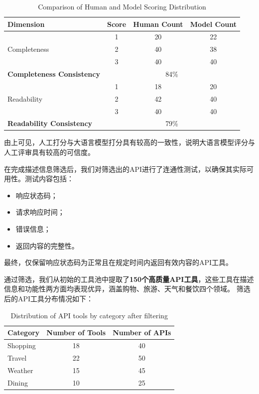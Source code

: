 \begin{table}[h]
  \centering
  \caption{Comparison of Human and Model Scoring Distribution}
  \label{tab:api_score_comparison}
  \begin{tabular}{l|c|c|c}
  \toprule
  \textbf{Dimension} & \textbf{Score} & \textbf{Human Count} & \textbf{Model Count} \\ \midrule
  \multirow{3}{*}{Completeness} & 1 & 20 & 22 \\ 
                                & 2 & 40 & 38 \\ 
                                & 3 & 40 & 40 \\ \hline
  \textbf{Completeness Consistency} & \multicolumn{3}{c}{84\%} \\ \midrule
  \multirow{3}{*}{Readability}  & 1 & 18 & 20 \\ 
                                & 2 & 42 & 40 \\ 
                                & 3 & 40 & 40 \\ \hline
  \textbf{Readability Consistency} & \multicolumn{3}{c}{79\%} \\ 
  \bottomrule
  \end{tabular}
  \end{table}

由上可见，人工打分与大语言模型打分具有较高的一致性，说明大语言模型评分与人工评审具有较高的可信度。

在完成描述信息筛选后，我们对筛选出的API进行了连通性测试，以确保其实际可用性。测试内容包括：
\begin{itemize}
    \item 响应状态码；
    \item 请求响应时间；
    \item 错误信息；
    \item 返回内容的完整性。
\end{itemize}

最终，仅保留响应状态码为正常且在规定时间内返回有效内容的API工具。

通过筛选，我们从初始的工具池中提取了\textbf{150个高质量API工具}，这些工具在描述信息和功能性两方面均表现优异，涵盖购物、旅游、天气和餐饮四个领域。
筛选后的API工具分布情况如下：

\begin{table}[h]
  \centering
  \caption{Distribution of API tools by category after filtering}
  \label{tab:api_distribution}
  \begin{tabular}{l|c|c}
  \toprule
  \textbf{Category} & \textbf{Number of Tools} & \textbf{Number of APIs} \\ \midrule
  Shopping & 18 & 40 \\ \hline
  Travel   & 22 & 50 \\ \hline
  Weather  & 15 & 45 \\ \hline
  Dining   & 10 & 25 \\ 
  \bottomrule
  \end{tabular}
  \end{table}

